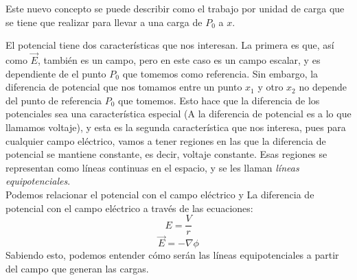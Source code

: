 \documentclass[article,12pt]{elsarticle}
\begin{document}
Este nuevo concepto se puede describir como el trabajo por unidad de carga que se tiene que realizar para llevar a una carga de $P_{0}$ a $x$.

El potencial tiene dos características que nos interesan. La primera es que, así como $\Vec{E}$, también es un campo, pero en este caso es un campo escalar, y es dependiente de el punto $P_{0}$ que tomemos como referencia.
Sin embargo, la diferencia de potencial que nos tomamos entre un punto $x_1$ y otro $x_2$ no depende del punto de referencia $P_0$ que tomemos. Esto hace que la diferencia de los potenciales sea una característica especial (A la diferencia de potencial es a lo que llamamos voltaje), y esta es la segunda característica que nos interesa, pues para cualquier campo eléctrico, vamos a tener regiones en las que la diferencia de potencial se mantiene constante, es decir, voltaje constante. Esas regiones se representan como líneas continuas en el espacio, y se les llaman \textit{líneas equipotenciales}.
\\
Podemos relacionar  el potencial con el campo eléctrico y La diferencia de potencial con el campo eléctrico a través de las ecuaciones:
\begin{equation}
    E = \frac{V}{r}
\end{equation}
\begin{equation}
    \Vec{E} = - \nabla \phi
\end{equation}
Sabiendo esto, podemos entender cómo serán las líneas equipotenciales a partir del campo que generan las cargas.\\
\end{document}
